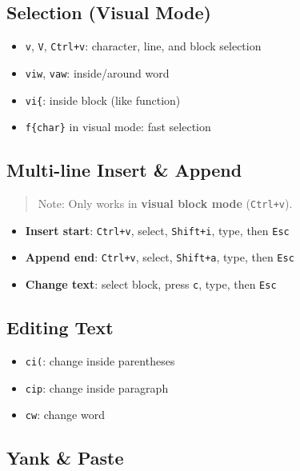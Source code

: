 \documentclass[
  letterpaper,
  DIV=11,
  numbers=noendperiod]{scrartcl}
\providecommand{\tightlist}{%
  \setlength{\itemsep}{0pt}\setlength{\parskip}{0pt}}\usepackage{longtable,booktabs,array}
\begin{document}
\subsection{Selection (Visual Mode)}\label{selection-visual-mode}

\begin{itemize}
\tightlist
\item
  \texttt{v}, \texttt{V}, \texttt{Ctrl+v}: character, line, and block
  selection
\item
  \texttt{viw}, \texttt{vaw}: inside/around word
\item
  \texttt{vi\{}: inside block (like function)
\item
  \texttt{f\{char\}} in visual mode: fast selection
\end{itemize}

\subsection{Multi-line Insert \& Append}\label{multi-line-insert-append}

\begin{quote}
Note: Only works in \textbf{visual block mode} (\texttt{Ctrl+v}).
\end{quote}

\begin{itemize}
\tightlist
\item
  \textbf{Insert start}: \texttt{Ctrl+v}, select, \texttt{Shift+i},
  type, then \texttt{Esc}
\item
  \textbf{Append end}: \texttt{Ctrl+v}, select, \texttt{Shift+a}, type,
  then \texttt{Esc}
\item
  \textbf{Change text}: select block, press \texttt{c}, type, then
  \texttt{Esc}
\end{itemize}

\subsection{Editing Text}\label{editing-text}

\begin{itemize}
\tightlist
\item
  \texttt{ci(}: change inside parentheses
\item
  \texttt{cip}: change inside paragraph
\item
  \texttt{cw}: change word
\end{itemize}

\subsection{Yank \& Paste}\label{yank-paste}
\end{document}

